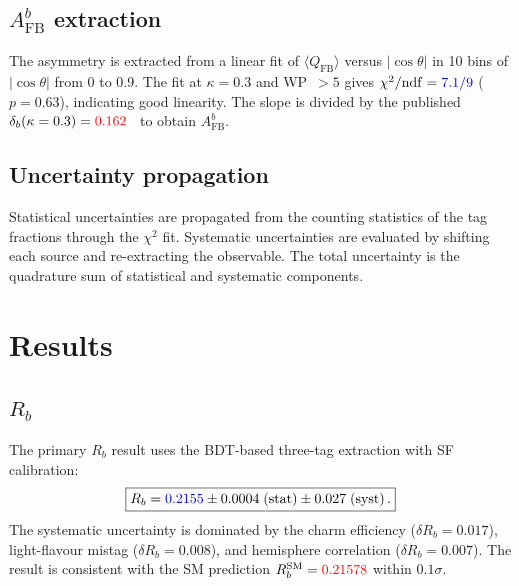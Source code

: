 \documentclass[11pt,a4paper]{article}
\newcommand{\measured}[1]{\textcolor{blue}{#1}}
\newcommand{\external}[1]{\textcolor{red}{#1}}
\begin{document}
\subsection{$A_\mathrm{FB}^b$ extraction}

The asymmetry is extracted from a linear fit of
$\langle Q_\mathrm{FB} \rangle$ versus $|\cos\theta|$ in 10 bins of
$|\cos\theta|$ from 0 to 0.9.  The fit at $\kappa = 0.3$ and WP~$> 5$
gives $\chi^2/\mathrm{ndf} = \measured{7.1/9}$ ($p = 0.63$),
indicating good linearity.  The slope is divided by the published
$\delta_b(\kappa = 0.3) = \external{0.162}$~\cite{LEP:EWWG:2005} to
obtain $A_\mathrm{FB}^b$.

\subsection{Uncertainty propagation}

Statistical uncertainties are propagated from the counting statistics of
the tag fractions through the $\chi^2$ fit.  Systematic uncertainties are
evaluated by shifting each source and re-extracting the observable.  The
total uncertainty is the quadrature sum of statistical and systematic
components.

\section{Results}
\label{sec:results}

\subsection{$R_b$}

The primary $R_b$ result uses the BDT-based three-tag extraction with
SF calibration:
\begin{equation}
\boxed{
  R_b = \measured{0.2155} \pm 0.0004\;\mathrm{(stat)} \pm
  0.027\;\mathrm{(syst)}\,.
}
\label{eq:rb-result}
\end{equation}
The systematic uncertainty is dominated by the charm efficiency
($\delta R_b = 0.017$), light-flavour mistag ($\delta R_b = 0.008$),
and hemisphere correlation ($\delta R_b = 0.007$).  The result is
consistent with the SM prediction $R_b^\mathrm{SM} = \external{0.21578}$
within $0.1\sigma$.
\end{document}
